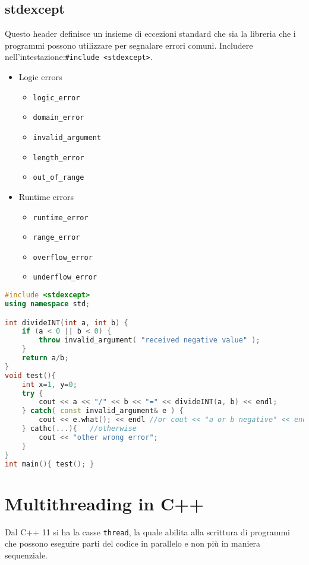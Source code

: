 \subsection{stdexcept}
Questo header definisce un insieme di eccezioni standard che sia la libreria che i programmi possono utilizzare per segnalare errori comuni.
Includere nell'intestazione:\verb|#include <stdexcept>|.

\begin{itemize}
    \item Logic errors 
        \begin{itemize}
            \item \verb|logic_error|
            \item \verb|domain_error|
            \item \verb|invalid_argument|
            \item \verb|length_error|
            \item \verb|out_of_range|            
        \end{itemize}

    \item Runtime errors
        \begin{itemize}
            \item \verb|runtime_error|
            \item \verb|range_error|
            \item \verb|overflow_error|
            \item \verb|underflow_error|            
        \end{itemize}
\end{itemize}


\begin{lstlisting}[language=c++]
#include <stdexcept>
using namespace std;

int divideINT(int a, int b) {
    if (a < 0 || b < 0) {
        throw invalid_argument( "received negative value" );
    }
    return a/b;
}
void test(){
    int x=1, y=0; 
    try {
        cout << a << "/" << b << "=" << divideINT(a, b) << endl;
    } catch( const invalid_argument& e ) {
        cout << e.what(); << endl //or cout << "a or b negative" << endl;    //cout << e << endl; //bind ERROR    
    } cathc(...){   //otherwise
        cout << "other wrong error";
    }
}
int main(){ test(); }
\end{lstlisting}

\section{Multithreading in C++}
Dal C++ 11 si ha la casse \verb|thread|, la quale abilita alla scrittura di programmi che possono eseguire parti del codice in parallelo e non più in maniera sequenziale.

